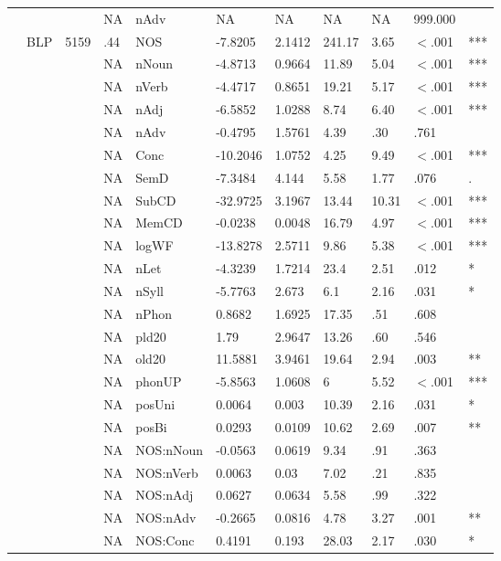 \begin{table}[ht]
\begin{tabular}{lllllllllll}
   &  &  & NA & nAdv & NA & NA & NA & NA & 999.000 &  \\ 
   & BLP & 5159 & .44 & NOS & -7.8205 & 2.1412 & 241.17 & 3.65 & $<$.001 & *** \\ 
   &  &  & NA & nNoun & -4.8713 & 0.9664 & 11.89 & 5.04 & $<$.001 & *** \\ 
   &  &  & NA & nVerb & -4.4717 & 0.8651 & 19.21 & 5.17 & $<$.001 & *** \\ 
   &  &  & NA & nAdj & -6.5852 & 1.0288 & 8.74 & 6.40 & $<$.001 & *** \\ 
   &  &  & NA & nAdv & -0.4795 & 1.5761 & 4.39 & .30 & .761 &   \\ 
   &  &  & NA & Conc & -10.2046 & 1.0752 & 4.25 & 9.49 & $<$.001 & *** \\ 
   &  &  & NA & SemD & -7.3484 & 4.144 & 5.58 & 1.77 & .076 & . \\ 
   &  &  & NA & SubCD & -32.9725 & 3.1967 & 13.44 & 10.31 & $<$.001 & *** \\ 
   &  &  & NA & MemCD & -0.0238 & 0.0048 & 16.79 & 4.97 & $<$.001 & *** \\ 
   &  &  & NA & logWF & -13.8278 & 2.5711 & 9.86 & 5.38 & $<$.001 & *** \\ 
   &  &  & NA & nLet & -4.3239 & 1.7214 & 23.4 & 2.51 & .012 & * \\ 
   &  &  & NA & nSyll & -5.7763 & 2.673 & 6.1 & 2.16 & .031 & * \\ 
   &  &  & NA & nPhon & 0.8682 & 1.6925 & 17.35 & .51 & .608 &   \\ 
   &  &  & NA & pld20 & 1.79 & 2.9647 & 13.26 & .60 & .546 &   \\ 
   &  &  & NA & old20 & 11.5881 & 3.9461 & 19.64 & 2.94 & .003 & ** \\ 
   &  &  & NA & phonUP & -5.8563 & 1.0608 & 6 & 5.52 & $<$.001 & *** \\ 
   &  &  & NA & posUni & 0.0064 & 0.003 & 10.39 & 2.16 & .031 & * \\ 
   &  &  & NA & posBi & 0.0293 & 0.0109 & 10.62 & 2.69 & .007 & ** \\ 
   &  &  & NA & NOS:nNoun & -0.0563 & 0.0619 & 9.34 & .91 & .363 &   \\ 
   &  &  & NA & NOS:nVerb & 0.0063 & 0.03 & 7.02 & .21 & .835 &   \\ 
   &  &  & NA & NOS:nAdj & 0.0627 & 0.0634 & 5.58 & .99 & .322 &   \\ 
   &  &  & NA & NOS:nAdv & -0.2665 & 0.0816 & 4.78 & 3.27 & .001 & ** \\ 
   &  &  & NA & NOS:Conc & 0.4191 & 0.193 & 28.03 & 2.17 & .030 & * \\ 

\end{tabular}
\end{table}
